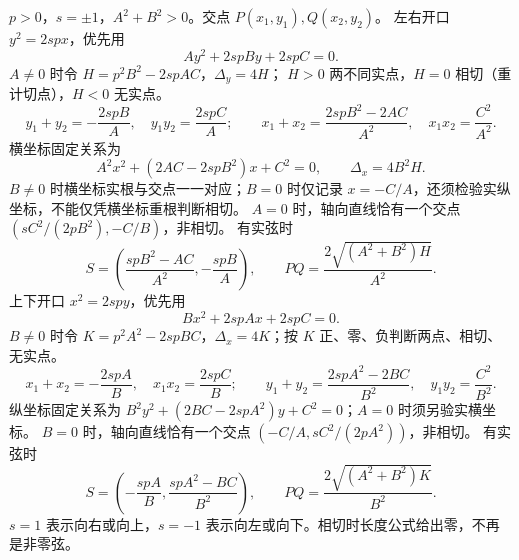 $p>0$，$s=\pm1$，$A^2+B^2>0$。交点 $P(x_1,y_1),Q(x_2,y_2)$。
左右开口 $y^2=2spx$，优先用
\[
 Ay^2+2spBy+2spC=0.
\]
$A\ne0$ 时令 $H=p^2B^2-2spAC$，$\Delta_y=4H$；
$H>0$ 两不同实点，$H=0$ 相切（重计切点），$H<0$ 无实点。
\[
 y_1+y_2=-\frac{2spB}{A},\quad y_1y_2=\frac{2spC}{A};\qquad
 x_1+x_2=\frac{2spB^2-2AC}{A^2},\quad x_1x_2=\frac{C^2}{A^2}.
\]
横坐标固定关系为
\[
 A^2x^2+(2AC-2spB^2)x+C^2=0,\qquad \Delta_x=4B^2H.
\]
$B\ne0$ 时横坐标实根与交点一一对应；$B=0$ 时仅记录 $x=-C/A$，还须检验实纵坐标，不能仅凭横坐标重根判断相切。
$A=0$ 时，轴向直线恰有一个交点 $(sC^2/(2pB^2),-C/B)$，非相切。
有实弦时
\[
 S=\left(\frac{spB^2-AC}{A^2},-\frac{spB}{A}\right),\qquad
 PQ=\frac{2\sqrt{(A^2+B^2)H}}{A^2}.
\]
上下开口 $x^2=2spy$，优先用
\[
 Bx^2+2spAx+2spC=0.
\]
$B\ne0$ 时令 $K=p^2A^2-2spBC$，$\Delta_x=4K$；按 $K$ 正、零、负判断两点、相切、无实点。
\[
 x_1+x_2=-\frac{2spA}{B},\quad x_1x_2=\frac{2spC}{B};\qquad
 y_1+y_2=\frac{2spA^2-2BC}{B^2},\quad y_1y_2=\frac{C^2}{B^2}.
\]
纵坐标固定关系为 $B^2y^2+(2BC-2spA^2)y+C^2=0$；$A=0$ 时须另验实横坐标。
$B=0$ 时，轴向直线恰有一个交点 $(-C/A,sC^2/(2pA^2))$，非相切。
有实弦时
\[
 S=\left(-\frac{spA}{B},\frac{spA^2-BC}{B^2}\right),\qquad
 PQ=\frac{2\sqrt{(A^2+B^2)K}}{B^2}.
\]
$s=1$ 表示向右或向上，$s=-1$ 表示向左或向下。相切时长度公式给出零，不再是非零弦。
